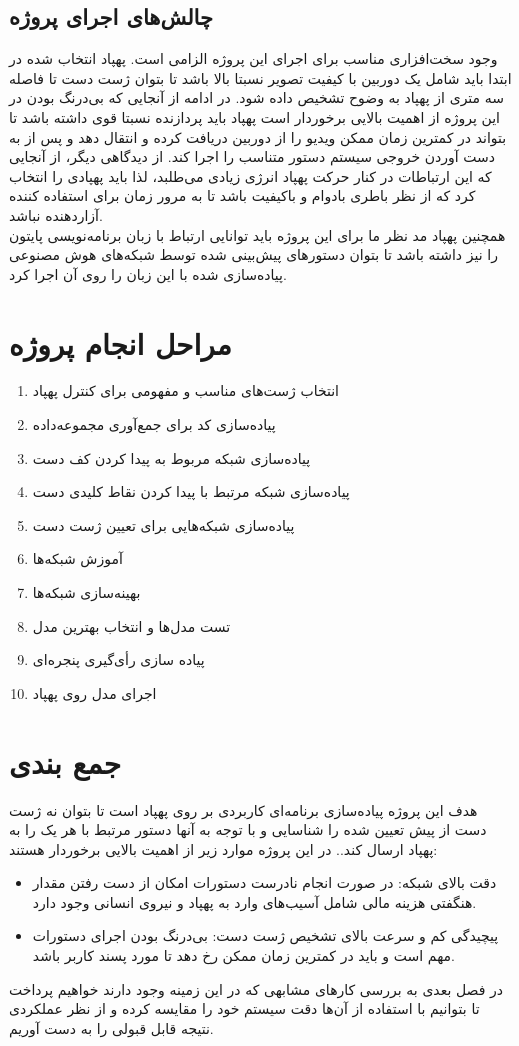 \subsection{چالش‌های اجرای پروژه}
وجود سخت‌افزاری مناسب برای اجرای این پروژه الزامی است. پهپاد انتخاب شده در ابتدا باید شامل یک دوربین با کیفیت تصویر
نسبتا بالا باشد تا بتوان ژست دست تا فاصله سه متری از پهپاد به وضوح تشخيص داده شود.
در ادامه از آنجایی که بی‌درنگ بودن در این پروژه از اهمیت بالایی برخوردار است پهپاد باید پردازنده نسبتا قوی داشته باشد تا بتواند در کمترین زمان ممکن ویدیو را از دوربین دریافت کرده و انتقال دهد و پس از به دست آوردن خروجی سیستم دستور متناسب را اجرا کند. از دیدگاهی دیگر، از آنجایی که این ارتباطات در کنار حرکت پهپاد انرژی زیادی می‌طلبد، لذا باید پهپادی را انتخاب کرد
که از نظر باطری بادوام و باکیفیت باشد تا به مرور زمان برای استفاده کننده آزاردهنده نباشد.
\\
همچنین پهپاد مد نظر ما برای این پروژه باید توانایی ارتباط با  زبان برنامه‌نویسی پایتون را نیز داشته باشد تا بتوان دستورهای پیش‌بینی شده توسط شبکه‌های هوش مصنوعی پیاده‌سازی شده با این زبان را روی آن اجرا کرد.


\section{مراحل انجام پروژه}
\begin{enumerate}
    \item  انتخاب ژست‌های مناسب و مفهومی برای کنترل پهپاد
    \item  پیاده‌سازی کد برای جمع‌آوری مجموعه‌داده
    \item  پیاده‌سازی شبکه مربوط به پیدا کردن کف دست 
    \item  پیاده‌سازی شبکه مرتبط با پیدا کردن نقاط کلیدی دست 
    \item  پیاده‌سازی شبکه‌هایی برای تعیین ژست دست
    \item  آموزش شبکه‌ها
    \item  بهینه‌سازی شبکه‌ها
    \item  تست مدل‌ها و انتخاب بهترین مدل
    \item  پیاده سازی رأی‌گیری پنجره‌ای
    \item  اجرای مدل روی پهپاد
\end{enumerate}
 

\section{جمع بندی}
 هدف این پروژه پیاده‌سازی برنامه‌ای کاربردی بر روی پهپاد است تا بتوان نه ژست دست از پیش تعیین شده را شناسایی و با توجه به آنها دستور مرتبط با هر یک را به پهپاد ارسال کند..
 در این پروژه موارد زیر از اهمیت بالایی برخوردار هستند:
 \begin{itemize}
    \item دقت بالای شبکه: در صورت انجام نادرست دستورات امکان از دست رفتن مقدار هنگفتی هزینه مالی شامل آسیب‌های وارد به پهپاد و نیروی انسانی وجود دارد.
    \item پیچیدگی کم و سرعت بالای تشخیص ژست دست: بی‌درنگ بودن اجرای دستورات مهم است و باید در کمترین زمان ممکن رخ دهد تا مورد پسند کاربر باشد.
\end{itemize}

در فصل بعدی به بررسی کار‌های مشابهی که در این زمینه وجود دارند خواهیم پرداخت تا بتوانیم با استفاده از آن‌ها دقت سیستم خود را مقایسه کرده و از نظر 
عملکردی نتیجه قابل قبولی را به دست آوریم.



